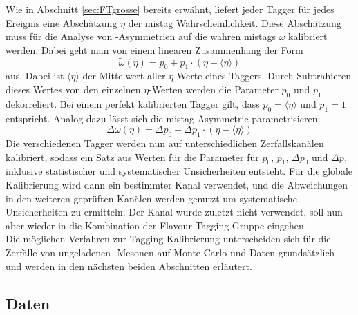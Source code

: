 Wie in Abschnitt \ref{sec:FTgrosse} bereits erwähnt, liefert jeder Tagger für jedes Ereignis eine Abschätzung $\eta$ der mistag Wahrscheinlichkeit. Diese Abschätzung muss für die Analyse von \CP-Asymmetrien auf die wahren mistags $\omega$ kalibriert werden. Dabei geht man von einem linearen Zusammenhang der Form
\begin{equation}
\widetilde{\omega}(\eta)=p_0+p_1\cdot\left(\eta-\langle\eta\rangle\right)\label{eq:linear}
\end{equation}
aus. Dabei ist $\langle\eta\rangle$ der Mittelwert aller $\eta$-Werte eines Taggers. Durch Subtrahieren dieses Wertes von den einzelnen $\eta$-Werten werden die Parameter $p_0$ und $p_1$ dekorreliert. Bei einem perfekt kalibrierten Tagger gilt, dass $p_0=\langle\eta\rangle$ und $p_1=1$ entspricht. Analog dazu lässt sich die mistag-Asymmetrie parametrisieren:
\begin{equation}
\Delta\omega(\eta)=\Delta p_0+\Delta p_1\cdot\left(\eta-\langle\eta\rangle\right)\label{eq:lineardelta}
\end{equation}
Die verschiedenen Tagger werden nun auf unterschiedlichen Zerfallskanälen kalibriert, sodass ein Satz aus Werten für die Parameter für $p_0$, $p_1$, $\Delta p_0$ und $\Delta p_1$ inklusive statistischer und systematischer Unsicherheiten entsteht. Für die globale Kalibrierung wird dann ein bestimmter Kanal verwendet, und die Abweichungen in den weiteren geprüften Kanälen werden genutzt um systematische Unsicherheiten zu ermitteln. Der Kanal \BdToDpi wurde zuletzt nicht verwendet, soll nun aber wieder in die Kombination der Flavour Tagging Gruppe eingehen.\\
Die möglichen Verfahren zur Tagging Kalibrierung unterscheiden sich für die Zerfälle von ungeladenen \B-Mesonen auf Monte-Carlo und Daten grundsätzlich und werden in den nächsten beiden Abschnitten erläutert.   

\subsection{Daten}\label{sec:kalibrierungDaten}

